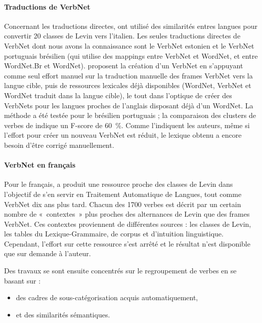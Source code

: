 \paragraph{Traductions de VerbNet}

Concernant les traductions directes, \cite{merlo2002multilingual} ont utilisé
des similarités entres langues pour convertir 20 classes de Levin vers
l'italien. Les seules traductions directes de VerbNet dont nous avons la
connaissance sont le VerbNet estonien \citep{jentson2014verbnet} et le VerbNet
portuguais brésilien \citep{scarton2012towards} (qui utilise des mappings entre
VerbNet et WordNet, et entre WordNet.Br et WordNet). \cite{scarton2014using}
proposent la création d'un VerbNet en s'appuyant comme seul effort manuel sur
la traduction manuelle des frames VerbNet vers la langue cible, puis de
ressources lexicales déjà disponibles (WordNet, VerbNet et WordNet traduit dans
la langue cible), le tout dans l'optique de créer des VerbNets pour les langues
proches de l'anglais disposant déjà d'un WordNet.  La méthode a été testée pour
le brésilien portuguais ; la comparaison des clusters de verbes de
\citep{scarton2012towards} indique un F-score de 60~\%.  Comme l'indiquent les
auteurs, même si l'effort pour créer un nouveau VerbNet est réduit, le lexique
obtenu a encore besoin d'être corrigé manuellement.

\paragraph{VerbNet en français}

Pour le français, \cite{saintdizier1996constructing} a produit une ressource
proche des classes de Levin dans l'objectif de s'en servir en Traitement
Automatique de Langues, tout comme VerbNet dix ans plus tard. Chacun des 1700
verbes est décrit par un certain nombre de «~contextes~» plus proches des
alternances de Levin que des frames VerbNet. Ces contextes proviennent de
différentes sources : les classes de Levin, les tables du Lexique-Grammaire, de
corpus et d'intuition linguistique. Cependant, l'effort sur cette ressource
s'est arrêté et le résultat n'est disponible que sur demande à l'auteur.

Des travaux se sont ensuite concentrés sur le regroupement de verbes en se
basant sur :
\begin{itemize}
    \item des cadres de sous-catégorisation acquis automatiquement,
    \item et des similarités sémantiques.
\end{itemize}

